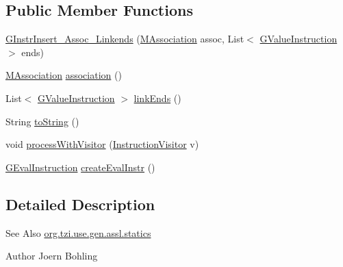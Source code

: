 \subsection*{Public Member Functions}
\begin{DoxyCompactItemize}
\item 
\hyperlink{classorg_1_1tzi_1_1use_1_1gen_1_1assl_1_1statics_1_1_g_instr_insert___assoc___linkends_a6ab33842be0f62a5eef4c7846fb7e631}{G\-Instr\-Insert\-\_\-\-Assoc\-\_\-\-Linkends} (\hyperlink{interfaceorg_1_1tzi_1_1use_1_1uml_1_1mm_1_1_m_association}{M\-Association} assoc, List$<$ \hyperlink{interfaceorg_1_1tzi_1_1use_1_1gen_1_1assl_1_1statics_1_1_g_value_instruction}{G\-Value\-Instruction} $>$ ends)
\item 
\hyperlink{interfaceorg_1_1tzi_1_1use_1_1uml_1_1mm_1_1_m_association}{M\-Association} \hyperlink{classorg_1_1tzi_1_1use_1_1gen_1_1assl_1_1statics_1_1_g_instr_insert___assoc___linkends_ae15f28389cf735ae32ac4dd0888b27a3}{association} ()
\item 
List$<$ \hyperlink{interfaceorg_1_1tzi_1_1use_1_1gen_1_1assl_1_1statics_1_1_g_value_instruction}{G\-Value\-Instruction} $>$ \hyperlink{classorg_1_1tzi_1_1use_1_1gen_1_1assl_1_1statics_1_1_g_instr_insert___assoc___linkends_a919355bc0513231ba60a12ae37ac638c}{link\-Ends} ()
\item 
String \hyperlink{classorg_1_1tzi_1_1use_1_1gen_1_1assl_1_1statics_1_1_g_instr_insert___assoc___linkends_ae560d2ff4034fde17bf0486aa3bfbfa4}{to\-String} ()
\item 
void \hyperlink{classorg_1_1tzi_1_1use_1_1gen_1_1assl_1_1statics_1_1_g_instr_insert___assoc___linkends_a4aaabaf15f5c3c5bc0840bf44dcd66fe}{process\-With\-Visitor} (\hyperlink{interfaceorg_1_1tzi_1_1use_1_1gen_1_1assl_1_1statics_1_1_instruction_visitor}{Instruction\-Visitor} v)
\item 
\hyperlink{classorg_1_1tzi_1_1use_1_1gen_1_1assl_1_1dynamics_1_1_g_eval_instruction}{G\-Eval\-Instruction} \hyperlink{classorg_1_1tzi_1_1use_1_1gen_1_1assl_1_1statics_1_1_g_instr_insert___assoc___linkends_ae203aabedab29f2d2dab5cd1a2c211e2}{create\-Eval\-Instr} ()
\end{DoxyCompactItemize}


\subsection{Detailed Description}
\begin{DoxySeeAlso}{See Also}
\hyperlink{namespaceorg_1_1tzi_1_1use_1_1gen_1_1assl_1_1statics}{org.\-tzi.\-use.\-gen.\-assl.\-statics} 
\end{DoxySeeAlso}
\begin{DoxyAuthor}{Author}
Joern Bohling 
\end{DoxyAuthor}


